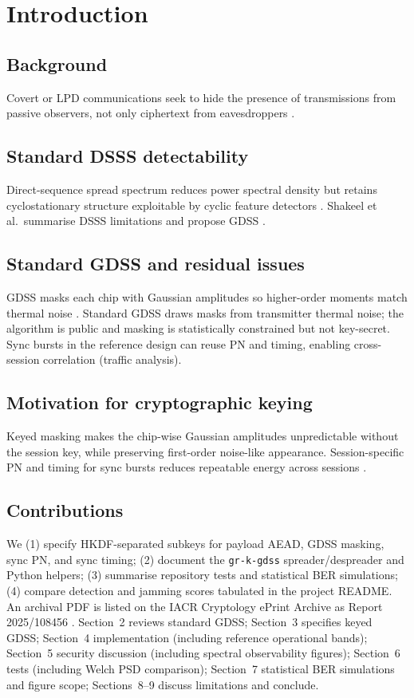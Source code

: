 \documentclass[10pt,a4paper,twocolumn]{article}
\begin{document}
\twocolumn

\section{Introduction}
\subsection{Background}
Covert or LPD communications seek to hide the presence of transmissions from passive observers, not only ciphertext from eavesdroppers \cite{bash2015,bash2013,turner1991}.

\subsection{Standard DSSS detectability}
Direct-sequence spread spectrum reduces power spectral density but retains cyclostationary structure exploitable by cyclic feature detectors \cite{gardner1992}. Shakeel et al.\ summarise DSSS limitations and propose GDSS \cite{shakeel2023}.

\subsection{Standard GDSS and residual issues}
GDSS masks each chip with Gaussian amplitudes so higher-order moments match thermal noise \cite{shakeel2023}. Standard GDSS draws masks from transmitter thermal noise; the algorithm is public and masking is statistically constrained but not key-secret. Sync bursts in the reference design can reuse PN and timing, enabling cross-session correlation (traffic analysis).

\subsection{Motivation for cryptographic keying}
Keyed masking makes the chip-wise Gaussian amplitudes unpredictable without the session key, while preserving first-order noise-like appearance. Session-specific PN and timing for sync bursts reduces repeatable energy across sessions \cite{repo_gdss}.

\subsection{Contributions}
We (1) specify HKDF-separated subkeys for payload AEAD, GDSS masking, sync PN, and sync timing; (2) document the \texttt{gr-k-gdss} spreader/despreader and Python helpers; (3) summarise repository tests and statistical BER simulations; (4) compare detection and jamming scores tabulated in the project README. An archival PDF is listed on the IACR Cryptology ePrint Archive as Report 2025/108456 \cite{eprint_kgdss_2025}. Section~2 reviews standard GDSS; Section~3 specifies keyed GDSS; Section~4 implementation (including reference operational bands); Section~5 security discussion (including spectral observability figures); Section~6 tests (including Welch PSD comparison); Section~7 statistical BER simulations and figure scope; Sections~8--9 discuss limitations and conclude.
\end{document}
